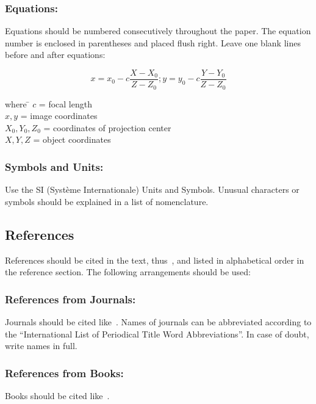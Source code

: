 \documentclass{isprs}
\begin{document}
\subsubsection{Equations:}\label{sec:Equations}

Equations should be numbered consecutively throughout the paper. The equation 
number is enclosed in parentheses and placed flush right. Leave one blank lines 
before and after equations: 


\begin{equation}\label{equ:1}
	x = x_0 -c \frac{X - X_0}{Z - Z_0}; y = y_0 -c \frac{Y - Y_0}{Z - Z_0}
\end{equation}

\begin{tabbing} 
where \hspace{0.6cm} \= $c$ = focal length\\
\> $x,y$ = image coordinates\\
\> $X_0,Y_0, Z_0$ = coordinates of projection center\\
\> $X, Y, Z$ = object coordinates
\end{tabbing}

\subsubsection{Symbols and Units:}\label{sec:Symbols and Units}
Use the SI (Syst\`{e}me Internationale) Units and Symbols. Unusual characters 
or symbols should be explained in a list of nomenclature.

\subsection{References}\label{sec:References}
References should be cited in the text, thus~\cite{smith1987rep}, and listed in alphabetical order in the reference section. The following arrangements should be used:

\subsubsection{References from Journals:} 
Journals should be cited like~\cite{smith1987art}. Names of journals can be abbreviated according to the ``International List of Periodical Title Word Abbreviations''. In case of doubt, write names in full.

\subsubsection{References from Books:} 
Books should be cited like~\cite{smith1989}.
\end{document}
